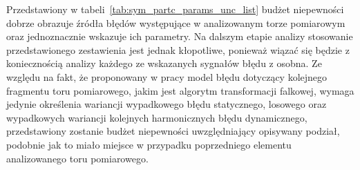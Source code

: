 Przedstawiony w tabeli~\ref{tab:sym_partc_params_unc_list} budżet niepewności dobrze obrazuje źródła błędów występujące w analizowanym torze pomiarowym oraz jednoznacznie wskazuje ich parametry. Na dalszym etapie analizy stosowanie przedstawionego zestawienia jest jednak kłopotliwe, ponieważ wiązać się będzie z koniecznością analizy każdego ze wskazanych sygnałów błędu z osobna. Ze względu na fakt, że proponowany w pracy model błędu dotyczący kolejnego fragmentu toru pomiarowego, jakim jest algorytm transformacji falkowej, wymaga jedynie określenia wariancji wypadkowego błędu statycznego, losowego oraz wypadkowych wariancji kolejnych harmonicznych błędu dynamicznego, przedstawiony zostanie budżet niepewności uwzględniający opisywany podział, podobnie jak to miało miejsce w przypadku poprzedniego elementu analizowanego toru pomiarowego.

